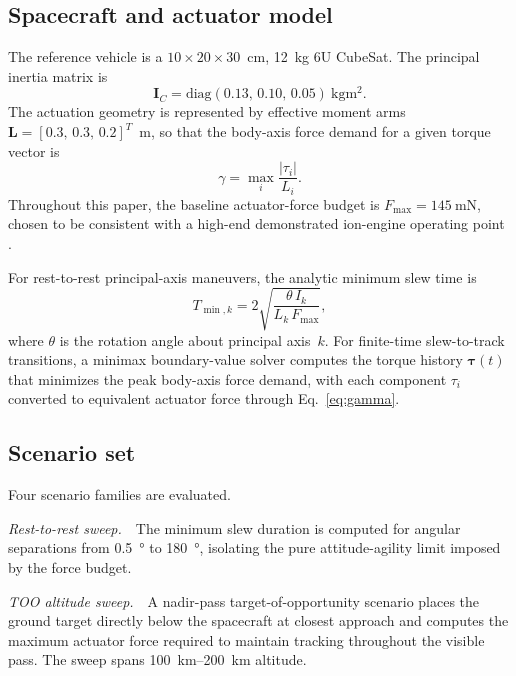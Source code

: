 \documentclass[conf]{new-aiaa}
\begin{document}
\subsection{Spacecraft and actuator model} \label{subsec:sc_model}

The reference vehicle is a $10 \times 20 \times 30$~cm, \SI{12}{\kilogram} 6U CubeSat. The principal inertia matrix is
\begin{equation}
    \mathbf{I}_{C} = \mathrm{diag}(0.13,\,0.10,\,0.05)~\si{\kilogram\meter\squared}.
\end{equation}
The actuation geometry is represented by effective moment arms $\mathbf{L} = [0.3,\,0.3,\,0.2]^T$~m, so that the body-axis force demand for a given torque vector is
\begin{equation}
    \gamma = \max_i \frac{|\tau_i|}{L_i}.
    \label{eq:gamma}
\end{equation}
Throughout this paper, the baseline actuator-force budget is $F_{\max}=\SI{145}{\milli\newton}$, chosen to be consistent with a high-end demonstrated ion-engine operating point \cite{t6eval}.

For rest-to-rest principal-axis maneuvers, the analytic minimum slew time is
\begin{equation}
    T_{\min,k} = 2\sqrt{\frac{\theta\, I_k}{L_k\, F_{\max}}},
    \label{eq:tmin}
\end{equation}
where $\theta$ is the rotation angle about principal axis~$k$. For finite-time slew-to-track transitions, a minimax boundary-value solver computes the torque history $\boldsymbol{\tau}(t)$ that minimizes the peak body-axis force demand, with each component $\tau_i$ converted to equivalent actuator force through Eq.~\eqref{eq:gamma}.

\subsection{Scenario set} \label{subsec:scenarios}

Four scenario families are evaluated.

\textit{Rest-to-rest sweep.}\ \ The minimum slew duration is computed for angular separations from \SI{0.5}{\degree} to \SI{180}{\degree}, isolating the pure attitude-agility limit imposed by the force budget.

\textit{TOO altitude sweep.}\ \ A nadir-pass target-of-opportunity scenario places the ground target directly below the spacecraft at closest approach and computes the maximum actuator force required to maintain tracking throughout the visible pass. The sweep spans \SIrange{100}{200}{\kilo\meter} altitude.
\end{document}
